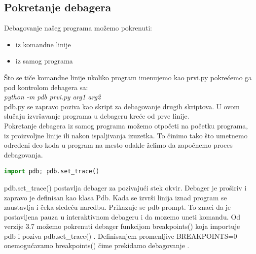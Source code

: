 \documentclass[a4paper]{article}
\begin{document}
\subsection{Pokretanje debagera}
Debagovanje našeg programa možemo pokrenuti:
\begin{itemize}
\item iz komandne linije
\item iz samog programa
\end{itemize}
Što se tiče komandne linije ukoliko program imenujemo kao prvi.py pokrećemo ga pod kontrolom debagera sa:
\\\emph{python -m pdb prvi.py arg1 arg2}
\\pdb.py se zapravo poziva kao skript za debagovanje drugih skriptova. U ovom slučaju izvršavanje programa u debageru kreće od prve linije.
\\Pokretanje debagera iz samog programa možemo otpočeti na početku programa, iz proizvoljne linije ili nakon ispaljivanja izuzetka. To činimo tako što umetnemo određeni deo koda u program na mesto odakle želimo da započnemo proces debagovanja.
\begin{lstlisting}[language = python, caption = {Započinjemo debagovanje}]
import pdb; pdb.set_trace()
\end{lstlisting}
pdb.set\_trace() postavlja debager za pozivajući stek okvir. Debager je proširiv i zapravo je definisan kao klasa Pdb. Kada se izvrši linija iznad program se zaustavlja i čeka sledeću naredbu. Prikazuje se pdb prompt. To znaci da je postavljena pauza u interaktivnom debageru i da mozemo uneti komandu.
Od verzije 3.7 možemo pokrenuti debager funkcijom breakpoints() koja importuje pdb i poziva pdb.set\_trace() \cite{pdbExamples}. Definisanjem promenljive BREAKPOINTS=0 onemogućavamo breakpoints() čime prekidamo debagovanje \cite{pdbExamples}.
\end{document}
